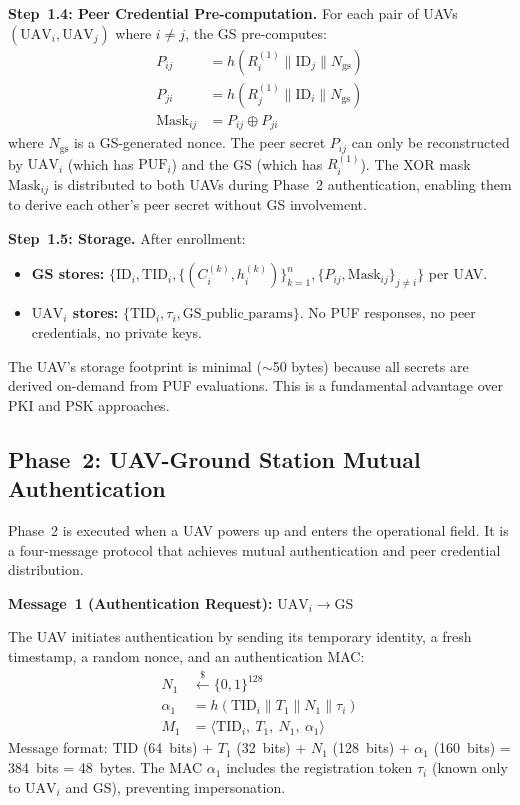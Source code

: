 \documentclass[11pt,a4paper]{article}
\begin{document}
\textbf{Step~1.4: Peer Credential Pre-computation.} For each pair of UAVs $(\text{UAV}_i, \text{UAV}_j)$ where $i \neq j$, the GS pre-computes:
\begin{align}
P_{ij} &= h(R_i^{(1)} \| \text{ID}_j \| N_{\text{gs}}) \label{eq:peer_secret} \\
P_{ji} &= h(R_j^{(1)} \| \text{ID}_i \| N_{\text{gs}}) \\
\text{Mask}_{ij} &= P_{ij} \oplus P_{ji}
\end{align}
where $N_{\text{gs}}$ is a GS-generated nonce. The peer secret $P_{ij}$ can only be reconstructed by $\text{UAV}_i$ (which has $\text{PUF}_i$) and the GS (which has $R_i^{(1)}$). The XOR mask $\text{Mask}_{ij}$ is distributed to both UAVs during Phase~2 authentication, enabling them to derive each other's peer secret without GS involvement.

\textbf{Step~1.5: Storage.} After enrollment:
\begin{itemize}[leftmargin=*]
    \item \textbf{GS stores:} $\{\text{ID}_i, \text{TID}_i, \{(C_i^{(k)}, h_i^{(k)})\}_{k=1}^{n}, \{P_{ij}, \text{Mask}_{ij}\}_{j \neq i}\}$ per UAV.
    \item \textbf{$\text{UAV}_i$ stores:} $\{\text{TID}_i, \tau_i, \text{GS\_public\_params}\}$. No PUF responses, no peer credentials, no private keys.
\end{itemize}

The UAV's storage footprint is minimal ($\sim$50 bytes) because all secrets are derived on-demand from PUF evaluations. This is a fundamental advantage over PKI and PSK approaches.

\subsection{Phase~2: UAV-Ground Station Mutual Authentication}

Phase~2 is executed when a UAV powers up and enters the operational field. It is a four-message protocol that achieves mutual authentication and peer credential distribution.

\textbf{Message~1 (Authentication Request):} $\text{UAV}_i \rightarrow \text{GS}$

The UAV initiates authentication by sending its temporary identity, a fresh timestamp, a random nonce, and an authentication MAC:
\begin{align}
N_1 &\xleftarrow{\$} \{0,1\}^{128} \\
\alpha_1 &= h(\text{TID}_i \| T_1 \| N_1 \| \tau_i) \\
M_1 &= \langle \text{TID}_i,\ T_1,\ N_1,\ \alpha_1 \rangle
\end{align}
Message format: $\text{TID}$ (64~bits) + $T_1$ (32~bits) + $N_1$ (128~bits) + $\alpha_1$ (160~bits) = 384~bits = 48~bytes. The MAC $\alpha_1$ includes the registration token $\tau_i$ (known only to $\text{UAV}_i$ and GS), preventing impersonation.
\end{document}
